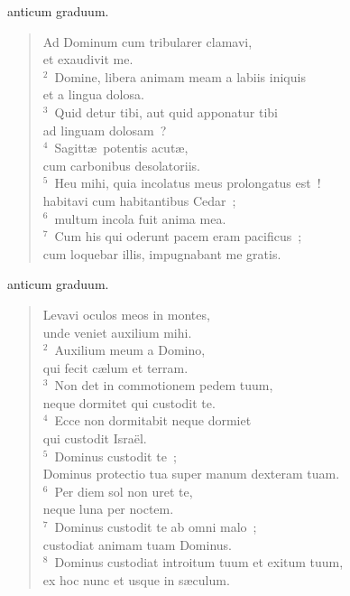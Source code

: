 \bchapter
{}anticum graduum. \begin{flushleft}\begin{verse}\vspace{6pt}Ad Dominum cum tribularer clamavi,\\ et exaudivit me.\\
${}^{2}$~Domine, libera animam meam a labiis iniquis\\ et a lingua dolosa.\\
${}^{3}$~Quid detur tibi, aut quid apponatur tibi\\ ad linguam dolosam~?\\
${}^{4}$~Sagitt\ae\ potentis acut\ae ,\\ cum carbonibus desolatoriis.\\
${}^{5}$~Heu mihi, quia incolatus meus prolongatus est~!\\ habitavi cum habitantibus Cedar~;\\
${}^{6}$~multum incola fuit anima mea.\\
${}^{7}$~Cum his qui oderunt pacem eram pacificus~;\\ cum loquebar illis, impugnabant me gratis.\end{verse}\end{flushleft}



\bchapter
{}anticum graduum. \begin{flushleft}\begin{verse}\vspace{6pt}Levavi oculos meos in montes,\\ unde veniet auxilium mihi.\\
${}^{2}$~Auxilium meum a Domino,\\ qui fecit c\ae lum et terram.\\
${}^{3}$~Non det in commotionem pedem tuum,\\ neque dormitet qui custodit te.\\
${}^{4}$~Ecce non dormitabit neque dormiet\\ qui custodit Isra\"el.\\
${}^{5}$~Dominus custodit te~;\\ Dominus protectio tua super manum dexteram tuam.\\
${}^{6}$~Per diem sol non uret te,\\ neque luna per noctem.\\
${}^{7}$~Dominus custodit te ab omni malo~;\\ custodiat animam tuam Dominus.\\
${}^{8}$~Dominus custodiat introitum tuum et exitum tuum,\\ ex hoc nunc et usque in s\ae culum.\end{verse}\end{flushleft}



